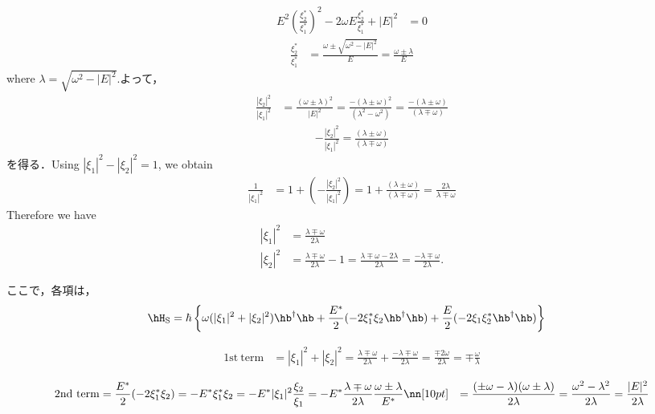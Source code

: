 \begin{align}
    E^{2}\left(\frac{\xi_2^{\ast}}{\xi_1^{\ast}}\right)^{2}-2\omega E\frac{\xi_2^{\ast}}{\xi_1^{\ast}}
    +|E|^2
    &=0
\end{align}
\begin{align}
    \frac{\xi_2^{\ast}}{\xi_1^{\ast}}
    &=\frac{\omega \pm\sqrt{\omega^2-|E|^2}}{E}
    =\frac{\omega \pm\lambda}{E}
\end{align}
where $\lambda=\sqrt{\omega^2-|E|^2}$.よって，
\begin{align}
    \frac{|\xi_2|^2}{|\xi_1|^2}
    &=\frac{(\omega \pm\lambda)^2}{|E|^2}
    =\frac{-(\lambda\pm\omega)^2}{(\lambda^2-\omega^2)}
    =\frac{-(\lambda\pm\omega)}{(\lambda\mp\omega)}
\end{align}
\begin{align}
    -\frac{|\xi_2|^2}{|\xi_1|^2}
    =\frac{(\lambda\pm\omega)}{(\lambda\mp\omega)}
\end{align}
を得る．Using $|\xi_1|^2-|\xi_2|^2=1$, we obtain
\begin{align}
    \frac{1}{|\xi_1|^2}&=1+\left(-\frac{|\xi_2|^2}{|\xi_1|^2}\right)
    =1+\frac{(\lambda\pm\omega)}{(\lambda\mp\omega)}=\frac{2\lambda}{\lambda\mp\omega}
\end{align}
Therefore we have
\begin{align}
    |\xi_1|^2&=\frac{\lambda\mp\omega}{2\lambda}\\[10pt]
    |\xi_2|^2&=\frac{\lambda\mp\omega}{2\lambda}-1=\frac{\lambda\mp\omega-2\lambda}{2\lambda}
    =\frac{-\lambda\mp\omega}{2\lambda}.
\end{align}


ここで，各項は，
\begin{align}
    \hH_{\rm{S}}
    &=\hbar\left\{\omega(|\xi_1|^2+|\xi_2|^2)\hb^\dag\hb
    +\frac{E^\ast}{2}(-2\xi_1^{\ast}\xi_2\hb^\dag\hb)
    +\frac{E}{2}(-2\xi_1\xi_2^{\ast}\hb^\dag\hb)
    \right\}
\end{align}




\begin{align}
    {\mathrm{1st\ term}}
    &=|\xi_1|^2+|\xi_2|^2=\frac{\lambda\mp\omega}{2\lambda}+\frac{-\lambda\mp\omega}{2\lambda}
    =\frac{\mp2\omega}{2\lambda}=\mp\frac{\omega}{\lambda}
\end{align}






\begin{align}
    {\mathrm{2nd\ term}}
    &=\frac{E^\ast}{2}(-2\xi_1^{\ast}\xi_2)
    =-E^\ast\xi_1^{\ast}\xi_2
    =-E^\ast|\xi_1|^2\frac{\xi_2}{\xi_1}
    =-E^\ast\frac{\lambda\mp\omega}{2\lambda}\frac{\omega\pm\lambda}{E^\ast}\nn[10pt]
    &=\frac{(\pm\omega-\lambda)(\omega\pm\lambda)}{2\lambda}
    =\frac{\omega^2-\lambda^2}{2\lambda}=\frac{|E|^2}{2\lambda}
\end{align}

